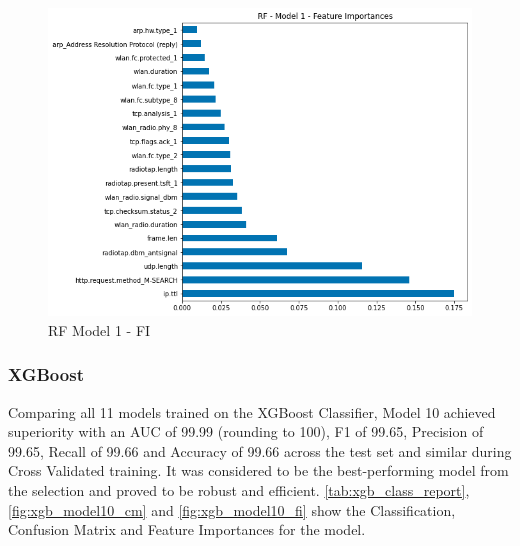 \begin{figure}[H]
    \centering
	\includegraphics[width=\textwidth]{Appendices/Images/RF/Model1/RF_Model1_FI.png}
	\caption{RF Model 1 - FI}
  	\label{fig:rf_model1_fi}
\end{figure}


\subsubsection*{XGBoost}

Comparing all 11 models trained on the XGBoost Classifier, Model 10 achieved superiority with an AUC of 99.99 (rounding to 100), F1 of 99.65, Precision of 99.65, Recall of 99.66 and Accuracy of 99.66 across the test set and similar during Cross Validated training. It was considered to be the best-performing model from the selection and proved to be robust and efficient. \ref{tab:xgb_class_report}, \ref{fig:xgb_model10_cm} and \ref{fig:xgb_model10_fi} show the Classification, Confusion Matrix and Feature Importances for the model.


